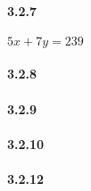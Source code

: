 \documentclass[8pt,twocolumn]{article}
\begin{document}
\paragraph{3.2.7}
$5x+7y=239$

\paragraph{3.2.8}

\paragraph{3.2.9}

\paragraph{3.2.10}

\paragraph{3.2.12}
\end{document}

